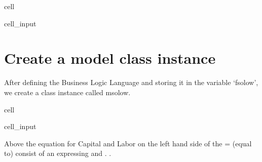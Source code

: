 \documentclass[letterpaper,10pt,english]{jupyterBook}
\begin{document}
\begin{sphinxuseclass}{cell}\begin{sphinxVerbatimInput}

\begin{sphinxuseclass}{cell_input}
\begin{sphinxVerbatim}[commandchars=\\\{\}]
  
\end{sphinxVerbatim}

\end{sphinxuseclass}\end{sphinxVerbatimInput}

\end{sphinxuseclass}

\section{Create a model class instance}
\label{\detokenize{content/notebooks/intro/Example Solow:create-a-model-class-instance}}
\sphinxAtStartPar
After defining the Business Logic Language and storing it in the variable ‘fsolow’, we create a class instance called msolow.

\begin{sphinxuseclass}{cell}\begin{sphinxVerbatimInput}

\begin{sphinxuseclass}{cell_input}
\begin{sphinxVerbatim}[commandchars=\\\{\}]
  
\end{sphinxVerbatim}

\end{sphinxuseclass}\end{sphinxVerbatimInput}

\end{sphinxuseclass}
\sphinxAtStartPar
Above the equation for Capital and Labor on the left hand side of the = (equal to) consist of an expressing  and . .
\end{document}
